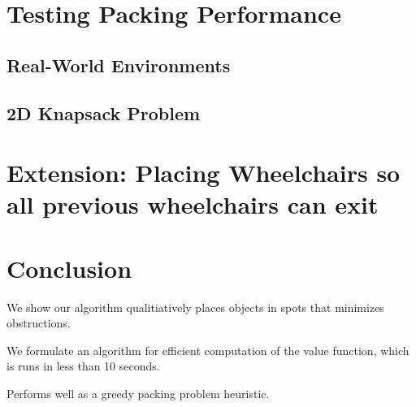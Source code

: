 \section{Testing Packing Performance}
\subsection{Real-World Environments}

\subsection{2D Knapsack Problem}

\section{Extension: Placing Wheelchairs so all previous wheelchairs can exit}


\section{Conclusion}

We show our algorithm qualitiatively places objects in spots that minimizes
obstructions.

We formulate an algorithm for efficient computation of the value function, which
is runs in less than 10 seconds.

Performs well as a greedy packing problem heuristic.

\endinput
Any text after an \endinput is ignored.
\subsection{Definitions}
TODO put closer to where it's used

\begin{itemize}
\item Configuration space
\item Pointcloud space
\item 2D Map space
\item Ground Map
\item Object Map
\item Unknown Map
\item Feasible states
\item Desirability function
\end{itemize}
